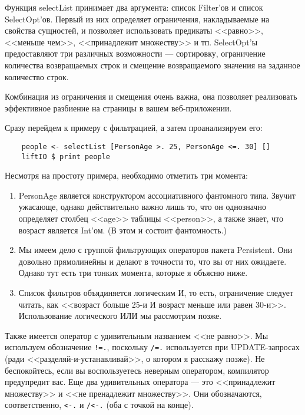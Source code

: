 Функция selectList принимает два аргумента: список Filter'ов и список SelectOpt'ов. Первый из них определяет ограничения, накладываемые на свойства сущностей, и позволяет использовать предикаты <<равно>>, <<меньше чем>>, <<принадлежит множеству>> и тп. SelectOpt'ы предоставляют три различных возможности --- сортировку, ограничение количества возвращаемых строк и смещение возвращаемого значения на заданное количество строк.

\begin{remark}
Комбинация из ограничения и смещения очень важна, она позволяет реализовать эффективное разбиение на страницы в вашем веб-приложении.
\end{remark}

Сразу перейдем к примеру с фильтрацией, а затем проанализируем его:

\begin{lstlisting}
    people <- selectList [PersonAge >. 25, PersonAge <=. 30] []
    liftIO $ print people
\end{lstlisting}%

Несмотря на простоту примера, необходимо отметить три момента:

\begin{enumerate}
\item PersonAge является конструктором ассоциативного фантомного типа. Звучит ужасающе, однако действительно важно лишь то, что он однозначно определяет столбец <<age>> таблицы <<person>>, а также знает, что возраст является Int'ом. (В этом и состоит фантомность.)
\item Мы имеем дело с группой фильтрующих операторов пакета Persistent. Они довольно прямолинейны и делают в точности то, что вы от них ожидаете. Однако тут есть три тонких момента, которые я объясню ниже.
\item Список фильтров объядиняется логическим И, то есть, ограничение следует читать, как <<возраст больше 25-и И возраст меньше или равен 30-и>>. Использование логического ИЛИ мы рассмотрим позже.
\end{enumerate}

Также имеется оператор с удивительным названием <<не равно>>. Мы используем обозначение \lstinline'!=.', поскольку \lstinline'/=.' используется при UPDATE-запросах (ради <<разделяй-и-устанавливай>>, о котором я расскажу позже). Не беспокойтесь, если вы воспользуетесь неверным оператором, компилятор предупредит вас. Еще два удивительных оператора --- это <<принадлежит множеству>> и <<не пренадлежит множеству>>. Они обозначаются, соответственно, \lstinline'<-.' и \lstinline'/<-.' (оба с точкой на конце).

